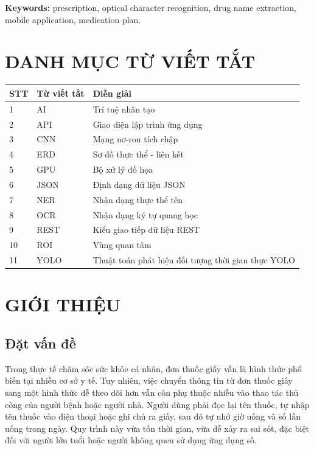 \documentclass[12pt,a4paper]{report}
\renewcommand{\arraystretch}{1.25}
\begin{document}
\noindent\textbf{Keywords:} prescription, optical character recognition, drug name extraction, mobile application, medication plan.

\tableofcontents
\clearpage
\listoffigures
\clearpage
\listoftables
\clearpage

\chapter*{DANH MỤC TỪ VIẾT TẮT}

{\renewcommand{\arraystretch}{1.4}
\noindent
\begin{tabularx}{\textwidth}{C{1.2cm}C{2.6cm}Y}
\toprule
\textbf{STT} & \textbf{Từ viết tắt} & \textbf{Diễn giải} \\
 & AI & Trí tuệ nhân tạo \\
2 & API & Giao diện lập trình ứng dụng \\
3 & CNN & Mạng nơ-ron tích chập \\
4 & ERD & Sơ đồ thực thể - liên kết \\
5 & GPU & Bộ xử lý đồ họa \\
6 & JSON & Định dạng dữ liệu JSON \\
7 & NER & Nhận dạng thực thể tên \\
8 & OCR & Nhận dạng ký tự quang học \\
9 & REST & Kiểu giao tiếp dữ liệu REST \\
10 & ROI & Vùng quan tâm \\
11 & YOLO & Thuật toán phát hiện đối tượng thời gian thực YOLO \\
\bottomrule
\end{tabularx}}

\clearpage
{}

\chapter{GIỚI THIỆU}

\section{Đặt vấn đề}

Trong thực tế chăm sóc sức khỏe cá nhân, đơn thuốc giấy vẫn là hình thức phổ biến tại nhiều cơ sở y tế. Tuy nhiên, việc chuyển thông tin từ đơn thuốc giấy sang một hình thức dễ theo dõi hơn vẫn còn phụ thuộc nhiều vào thao tác thủ công của người bệnh hoặc người nhà. Người dùng phải đọc lại tên thuốc, tự nhập tên thuốc vào điện thoại hoặc ghi chú ra giấy, sau đó tự nhớ giờ uống và số lần uống trong ngày. Quy trình này vừa tốn thời gian, vừa dễ xảy ra sai sót, đặc biệt đối với người lớn tuổi hoặc người không quen sử dụng ứng dụng số.
\end{document}
